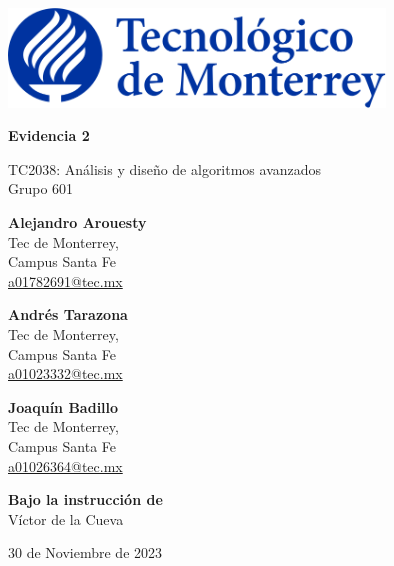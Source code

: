 \documentclass[12pt]{article}
\begin{document}
  \begin{titlepage}
    \begin{center}    
      \includegraphics[width=0.75\textwidth]{./img/logo-tec.png}
      
      \vspace{30pt}

      \begin{LARGE}\bf{Evidencia 2}\end{LARGE}
      
      \vspace{40pt}

      TC2038: Análisis y diseño de algoritmos avanzados\\
      Grupo 601\\
        
      \vspace{120pt}

      \begin{multicols}{3}
        \textbf{Alejandro Arouesty}\\
        Tec de Monterrey,\\
        Campus Santa Fe\\
        \href{mailto:a01782691@tec.mx}{a01782691@tec.mx}
        
        \columnbreak

        \textbf{Andrés Tarazona}\\
        Tec de Monterrey,\\
        Campus Santa Fe\\
        \href{mailto:a01023332@tec.mx}{a01023332@tec.mx}
        
        \columnbreak

        \textbf{Joaquín Badillo}\\
        Tec de Monterrey,\\
        Campus Santa Fe\\
        \href{mailto:a01026364@tec.mx}{a01026364@tec.mx}
      \end{multicols}
      
      \vspace{100pt}
      
      \textbf{Bajo la instrucción de} \\
      Víctor de la Cueva\\
      
      
      \vspace{80pt}
      
      30 de Noviembre de 2023
    \end{center}
  \end{titlepage}
  \pagebreak
\end{document}
